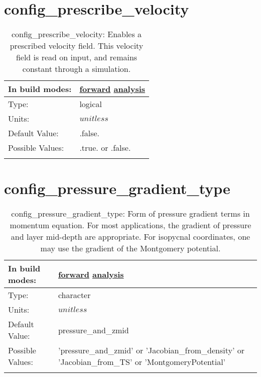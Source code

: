 \section[config\_prescribe\_velocity]{config\_prescribe\_velocity}
\label{sec:nm_sec_config_prescribe_velocity}
\begin{center}
\begin{longtable}{| p{2.0in} || p{4.0in} |}
    \hline
    In build modes: & \hyperref[subsec:forward_nm_tab_debug]{forward} \hyperref[subsec:analysis_nm_tab_debug]{analysis} \\
    \hline
    Type: & logical \\
    \hline
    Units: & $unitless$ \\
    \hline
    Default Value: & .false. \\
    \hline
    Possible Values: & .true. or .false. \\
    \hline
    \caption{config\_prescribe\_velocity: Enables a prescribed velocity field. This velocity field is read on input, and remains constant through a simulation.}
\end{longtable}
\end{center}
\section[config\_pressure\_gradient\_type]{config\_pressure\_gradient\_type}
\label{sec:nm_sec_config_pressure_gradient_type}
\begin{center}
\begin{longtable}{| p{2.0in} || p{4.0in} |}
    \hline
    In build modes: & \hyperref[subsec:forward_nm_tab_pressure_gradient]{forward} \hyperref[subsec:analysis_nm_tab_pressure_gradient]{analysis} \\
    \hline
    Type: & character \\
    \hline
    Units: & $unitless$ \\
    \hline
    Default Value: & pressure\_and\_zmid \\
    \hline
    Possible Values: & 'pressure\_and\_zmid' or 'Jacobian\_from\_density' or 'Jacobian\_from\_TS' or 'MontgomeryPotential' \\
    \hline
    \caption{config\_pressure\_gradient\_type: Form of pressure gradient terms in momentum equation. For most applications, the gradient of pressure and layer mid-depth are appropriate.  For isopycnal coordinates, one may use the gradient of the Montgomery potential.}
\end{longtable}
\end{center}
